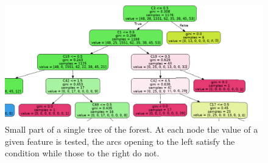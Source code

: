 \begin{figure}[!h]
 \centering
 \includegraphics[scale=0.4]{images/tree}
 \caption{\small{Small part of a single tree of the forest. At each node the value of a given feature is tested, the arcs opening to the left satisfy the condition while those to the right do not.}}
 \label{fig:tree}
\end{figure}


